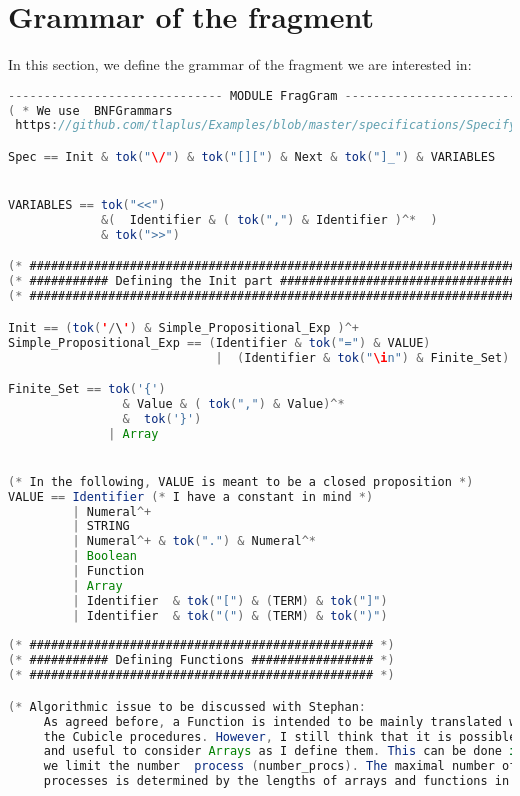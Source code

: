 \documentclass{article}
\theoremstyle{plain}
\numberwithin{equation}{section}
\begin{document}
\section{Grammar of the fragment } \label{Grammar}
In this section, we define the grammar of the fragment we are interested in: 

\begin{lstlisting}[language=java]
------------------------------ MODULE FragGram ------------------------------
( * We use  BNFGrammars
 https://github.com/tlaplus/Examples/blob/master/specifications/SpecifyingSystems/Syntax/BNFGrammars.tla * ) 

Spec == Init & tok("\/") & tok("[][") & Next & tok("]_") & VARIABLES


VARIABLES == tok("<<")  
             &(  Identifier & ( tok(",") & Identifier )^*  ) 
             & tok(">>")

(* ############################################################################################ *)
(* ########### Defining the Init part ######################################################### *)
(* ############################################################################################ *)

Init == (tok('/\') & Simple_Propositional_Exp )^+
Simple_Propositional_Exp == (Identifier & tok("=") & VALUE)   
                             |  (Identifier & tok("\in") & Finite_Set)

Finite_Set == tok('{') 
                & Value & ( tok(",") & Value)^*
                &  tok('}') 
              | Array 


(* In the following, VALUE is meant to be a closed proposition *)
VALUE == Identifier (* I have a constant in mind *) 
         | Numeral^+ 
         | STRING 
         | Numeral^+ & tok(".") & Numeral^*
         | Boolean   
         | Function
         | Array 
         | Identifier  & tok("[") & (TERM) & tok("]")
         | Identifier  & tok("(") & (TERM) & tok(")")
          
(* ################################################ *)
(* ########### Defining Functions ################# *)
(* ################################################ *)

(* Algorithmic issue to be discussed with Stephan:
     As agreed before, a Function is intended to be mainly translated w.r.t
     the Cubicle procedures. However, I still think that it is possible 
     and useful to consider Arrays as I define them. This can be done if 
     we limit the number  process (number_procs). The maximal number of 
     processes is determined by the lengths of arrays and functions in the TLA+ Spec  *)


\end{lstlisting}
\end{document}
